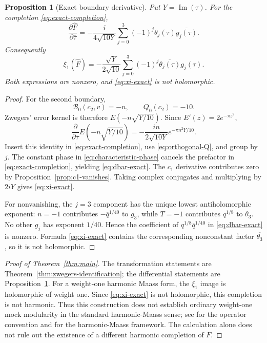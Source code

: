 \documentclass[12pt]{amsart}
\newtheorem{proposition}[theorem]{Proposition}
\theoremstyle{definition}
\theoremstyle{remark}
\begin{document}
\begin{proposition}[Exact boundary derivative]\label{prop:shadow}
Put $Y=\operatorname{Im}(\tau)$.
For the completion \eqref{eq:exact-completion},
\begin{equation}\label{eq:dbar-exact}
  \frac{\partial\widehat F}{\partial\overline\tau}
  =-\frac{i}{4\sqrt{10Y}}
    \sum_{j=0}^{3}(-1)^j\theta_j(\tau)\overline{g_j(\tau)}.
\end{equation}
Consequently
\begin{equation}\label{eq:xi-exact}
  \xi_1(\widehat F)
  =-\frac{\sqrt Y}{2\sqrt{10}}
    \sum_{j=0}^{3}(-1)^j\overline{\theta_j(\tau)}g_j(\tau).
\end{equation}
Both expressions are nonzero, and \eqref{eq:xi-exact} is not
holomorphic.
\end{proposition}

\begin{proof}
For the second boundary,
\[
  \mathcal B_0(c_2,v)=-n,
  \qquad Q_0(c_2)=-10.
\]
Zwegers' error kernel is therefore
$E(-n\sqrt{Y/10})$.  Since
$E'(z)=2e^{-\pi z^2}$,
\[
  \frac{\partial}{\partial\overline\tau}
  E(-n\sqrt{Y/10})
  =-\frac{in}{2\sqrt{10Y}}e^{-\pi n^2Y/10}.
\]
Insert this identity in \eqref{eq:exact-completion}, use
\eqref{eq:orthogonal-Q}, and group by $j$.  The constant phase in
\eqref{eq:characteristic-phase} cancels the prefactor in
\eqref{eq:exact-completion}, yielding \eqref{eq:dbar-exact}.  The
$c_1$ derivative contributes zero by
Proposition~\ref{prop:c1-vanishes}.  Taking complex conjugates and
multiplying by $2iY$ gives \eqref{eq:xi-exact}.

For nonvanishing, the $j=3$ component has the unique lowest
antiholomorphic exponent: $n=-1$ contributes
$-\overline q^{1/40}$ to $\overline{g_3}$, while $T=-1$ contributes
$q^{1/8}$ to $\theta_3$.  No other $g_j$ has exponent $1/40$.
Hence the coefficient of $q^{1/8}\overline q^{1/40}$ in
\eqref{eq:dbar-exact} is nonzero.  Formula \eqref{eq:xi-exact}
contains the corresponding nonconstant factor
$\overline{\theta_3}$, so it is not holomorphic.
\end{proof}

\begin{proof}[Proof of Theorem~\ref{thm:main}]
The transformation statements are
Theorem~\ref{thm:zwegers-identification}; the differential statements
are Proposition~\ref{prop:shadow}.  For a weight-one harmonic Maass
form, the $\xi_1$ image is holomorphic of weight one.  Since
\eqref{eq:xi-exact} is not holomorphic, this completion is not
harmonic.  Thus this construction does not establish ordinary
weight-one mock modularity in the standard harmonic-Maass sense; see
\cite{jBF04} for the operator convention and
\cite{oBFOR17} for the harmonic-Maass framework.  The calculation
alone does not rule out the existence of
a different harmonic completion of $F$.
\end{proof}
\end{document}

